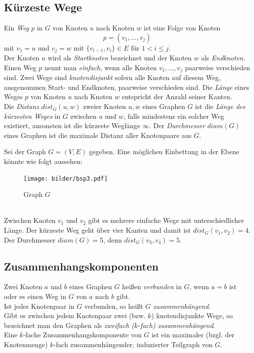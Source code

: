 \subsection{Kürzeste Wege}
Ein \emph{Weg} $p$ in $G$ von Knoten $u$ nach Knoten $w$ ist eine Folge von Knoten $$p=(v_1,\ldots,v_j)$$ mit $v_1=u$ und $v_j=w$ mit $\{v_{i-1},v_i\}\in E$ für $1 <i \leq j$.\\Der Knoten $u$ wird als \emph{Startknoten} bezeichnet und der Knoten $w$ als \emph{Endknoten}.%
\\Einen Weg $p$ nennt man \emph{einfach}, wenn alle Knoten $v_1,\ldots,v_j$ paarweise verschieden sind. Zwei Wege sind \emph{knotendisjunkt} sofern alle Knoten auf diesem Weg, ausgenommen Start- und Endknoten, paarweise verschieden sind. Die \emph{Länge} eines Weges $p$ von Knoten $u$ nach Knoten $w$ entspricht der Anzahl seiner Kanten.\\
Die \emph{Distanz} $dist_G(u,w)$ zweier Knoten $u,w$ eines Graphen $G$ ist die \emph{Länge des kürzesten Weges} in $G$ zwischen $u$ und $w$, falls mindestens ein solcher Weg existiert, ansonsten ist die kürzeste Weglänge $\infty$. Der \emph{Durchmesser} $diam(G)$ eines Graphen ist die maximale Distanz aller Knotenpaare aus $G$.
\begin{bsp}
Sei der Graph $G=(V,E)$ gegeben. Eine möglichen Einbettung in der Ebene könnte wie folgt aussehen:\\
\begin{figure}[h!]
		\centering 		 
   \texttt{[image: bilder/bsp3.pdf]}
	\caption{Graph $G$}
  	 \end{figure}
  	 \\
Zwischen Knoten $v_1$ und $v_2$ gibt es mehrere einfache Wege mit unterschiedlicher Länge. Der kürzeste Weg geht über vier Kanten und damit ist $dist_G(v_1, v_2)=4$. Der Durchmesser $diam(G)=5$, denn $dist_G(v_3, v_4)=5$.
\end{bsp}
\subsection{Zusammenhangskomponenten}
Zwei Knoten $a$ und $b$ eines Graphen $G$ heißen \emph{verbunden} in $G$, wenn $a = b$ ist oder es einen Weg in $G$ von $a$ nach $b$ gibt.\\Ist jedes Knotenpaar in $G$ verbunden, so heißt $G$ \emph{zusammenhängend}.\\Gibt es zwischen jedem Knotenpaar zwei (bzw. $k$) knotendisjunkte Wege, so bezeichnet man den Graphen als \emph{zweifach ($k$-fach) zusammenhängend}.\\Eine $k$-fache Zusammenhangskomponente von $G$ ist ein maximaler (bzgl. der Knotenmenge) $k$-fach zusammenhängender, induzierter Teilgraph von $G$.
